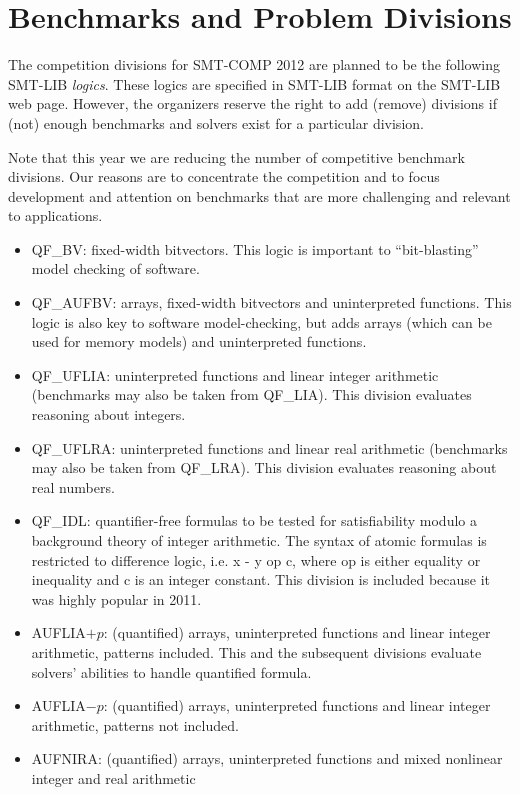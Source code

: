 \documentclass[12pt]{article}
\begin{document}
\section{Benchmarks and Problem Divisions}
\label{sec:theories}


The competition divisions for SMT-COMP 2012 are planned to be the following
SMT-LIB \emph{logics}.  These logics are specified in SMT-LIB format on the
SMT-LIB web page.  However, the organizers reserve the right to add
(remove) divisions if (not) enough benchmarks and solvers exist for a
particular division.

Note that this year we are reducing the number of competitive benchmark divisions.
Our reasons are to concentrate the competition and to focus development and attention
on benchmarks that are more challenging and relevant to applications.

\begin{itemize}

\item QF\_BV: fixed-width bitvectors. This logic is important to ``bit-blasting'' model checking of software.
\item QF\_AUFBV: arrays, fixed-width bitvectors and uninterpreted
functions. This logic is also key to software model-checking, but adds arrays (which can be used for memory models) and uninterpreted functions.

\item QF\_UFLIA: uninterpreted functions and linear integer arithmetic (benchmarks may also be taken from  QF\_LIA). This division evaluates reasoning about integers.
\item QF\_UFLRA: uninterpreted functions and linear real arithmetic (benchmarks may also be taken from  QF\_LRA). This division evaluates reasoning about real numbers.

\item QF\_IDL: quantifier-free formulas to be
  tested for satisfiability modulo a background theory of integer
  arithmetic.  The syntax of atomic formulas is restricted to
  difference logic, i.e. x - y op c, where op is either equality or
  inequality and c is an integer constant. This division is included because it was highly popular in 2011.

\item AUFLIA$+p$: (quantified) arrays, uninterpreted functions and 
linear integer arithmetic, patterns included. This and the subsequent divisions evaluate solvers' abilities to handle quantified formula.
\item AUFLIA$-p$: (quantified) arrays, uninterpreted functions and 
linear integer arithmetic, patterns not included.
\item AUFNIRA: (quantified) arrays, uninterpreted functions and 
mixed nonlinear integer and real arithmetic

\end{itemize}
\end{document}
